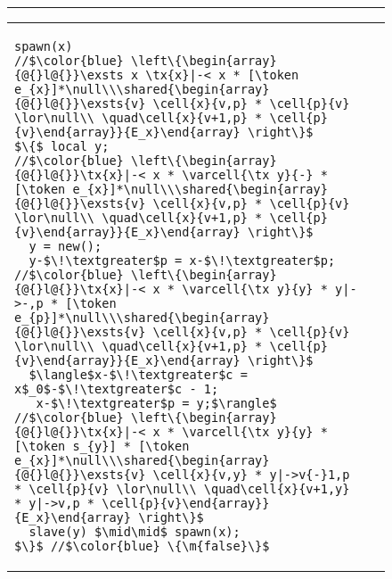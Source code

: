 \begin{figure}
\centering
\noindent\hrule
\begin{tabular}{@{} l @{\hspace{4ex}} l@{}}
{\begin{lstlisting}
spawn(x)
//$\color{blue} \left\{\begin{array}{@{}l@{}}\exsts x \tx{x}|-< x * [\token e_{x}]*\null\\\shared{\begin{array}{@{}l@{}}\exsts{v} \cell{x}{v,p} * \cell{p}{v} \lor\null\\ \quad\cell{x}{v+1,p} * \cell{p}{v}\end{array}}{E_x}\end{array} \right\}$
$\{$ local y;
//$\color{blue} \left\{\begin{array}{@{}l@{}}\tx{x}|-< x * \varcell{\tx y}{-} * [\token e_{x}]*\null\\\shared{\begin{array}{@{}l@{}}\exsts{v} \cell{x}{v,p} * \cell{p}{v} \lor\null\\ \quad\cell{x}{v+1,p} * \cell{p}{v}\end{array}}{E_x}\end{array} \right\}$
  y = new();
  y-$\!\textgreater$p = x-$\!\textgreater$p;
//$\color{blue} \left\{\begin{array}{@{}l@{}}\tx{x}|-< x * \varcell{\tx y}{y} * y|->-,p * [\token e_{p}]*\null\\\shared{\begin{array}{@{}l@{}}\exsts{v} \cell{x}{v,p} * \cell{p}{v} \lor\null\\ \quad\cell{x}{v+1,p} * \cell{p}{v}\end{array}}{E_x}\end{array} \right\}$
  $\langle$x-$\!\textgreater$c = x$_0$-$\!\textgreater$c - 1;
   x-$\!\textgreater$p = y;$\rangle$
//$\color{blue} \left\{\begin{array}{@{}l@{}}\tx{x}|-< x * \varcell{\tx y}{y} * [\token s_{y}] * [\token e_{x}]*\null\\\shared{\begin{array}{@{}l@{}}\exsts{v} \cell{x}{v,y} * y|->v{-}1,p * \cell{p}{v} \lor\null\\ \quad\cell{x}{v+1,y} * y|->v,p * \cell{p}{v}\end{array}}{E_x}\end{array} \right\}$
  slave(y) $\mid\mid$ spawn(x);
$\}$ //$\color{blue} \{\m{false}\}$
\end{lstlisting}}
&
\begin{lstlisting}

\end{lstlisting}
\end{tabular}
\end{figure}
